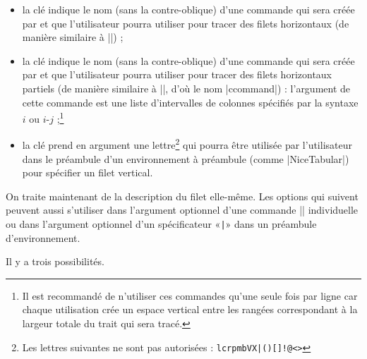 \documentclass[dvipsnames]{article}%
\begin{document}
\begin{itemize}
\item la clé  indique le nom (sans la contre-oblique) d'une commande
qui sera créée par  et que l'utilisateur pourra utiliser pour
tracer des filets horizontaux (de manière similaire à |\hline|) ; 

\item la clé  indique le nom (sans la contre-oblique) d'une
commande qui sera créée par  et que l'utilisateur pourra
utiliser pour tracer des filets horizontaux partiels (de manière similaire à
|\cline|, d'où le nom |ccommand|) : l'argument de cette commande est une liste
d'intervalles de colonnes spécifiés par la syntaxe $i$ ou $i$-$j$ ;\footnote{Il
  est recommandé de n'utiliser ces commandes qu'une seule fois par ligne car
  chaque utilisation crée un espace vertical entre les rangées correspondant à
  la largeur totale du trait qui sera tracé.}

\item la clé  prend en argument une lettre\footnote{Les lettres
  suivantes ne sont pas autorisées : \verb+lcrpmbVX|()[]!@<>+} qui pourra être
utilisée par l'utilisateur dans le préambule d'un environnement à préambule
(comme |{NiceTabular}|) pour spécifier un filet vertical.
\end{itemize}

\bigskip
On traite maintenant de la description du filet elle-même. Les options qui
suivent peuvent aussi s'utiliser dans l'argument optionnel d'une commande
|\Hline| individuelle ou dans l'argument optionnel d'un spécificateur «\verb+|+»
dans un préambule d'environnement.

\bigskip
Il y a trois possibilités.
\end{document}
